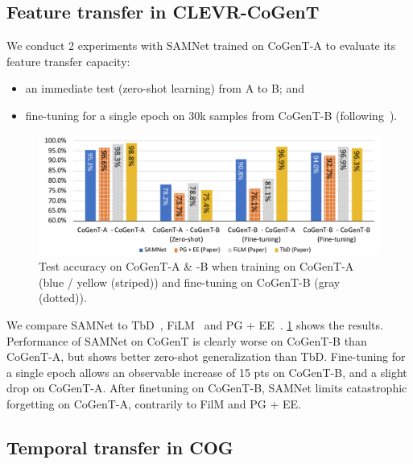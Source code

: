 \subsection{Feature transfer in CLEVR-CoGenT}
\label{sec:feature}


We conduct 2 experiments with SAMNet trained on CoGenT-A to evaluate its feature transfer capacity:
\begin{itemize}
\compresslist
\item an immediate test (zero-shot learning) from A to B; and
\item fine-tuning for a single epoch on 30k samples from CoGenT-B (following~\cite{johnson2017inferring, mascharka2018transparency, perez2018film, marois2018transfer}).
\end{itemize}

\begin{figure}[htbp]
	\centering
	\includegraphics[width=\columnwidth]{../results/CoGenT_B_results_with_baselines.pdf}
	\caption{Test accuracy on CoGenT-A \& -B when training on CoGenT-A (blue / yellow (striped)) and fine-tuning on CoGenT-B (gray (dotted)).}
	\label{fig:CoGenT-B-results}
\end{figure}

We compare SAMNet to TbD~\cite{mascharka2018transparency}, FiLM~\cite{perez2018film} and PG + EE~\cite{johnson2017inferring}. \cref{fig:CoGenT-B-results} shows the results. Performance of SAMNet on CoGenT is clearly worse on CoGenT-B than CoGenT-A, but shows better zero-shot generalization than TbD. Fine-tuning for a single epoch allows an observable increase of 15 pts on CoGenT-B, and a slight drop on CoGenT-A. After finetuning on CoGenT-B, SAMNet limits catastrophic forgetting on CoGenT-A, contrarily to FilM and PG + EE.

\subsection{Temporal transfer in COG}
\label{sec:temporal}


